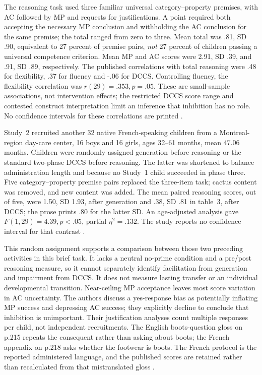 The reasoning task used three familiar universal category--property premises,
with AC followed by MP and requests for justifications. A point required both
accepting the necessary MP conclusion and withholding the AC conclusion for
the same premise; the total ranged from zero to three. Mean total was .81,
SD .90, equivalent to 27 percent of premise pairs, \emph{not} 27 percent
of children passing a universal competence criterion. Mean MP and AC scores
were 2.91, SD .39, and .91, SD .89, respectively. The published correlations
with total reasoning were .48 for flexibility, .37 for fluency and -.06 for
DCCS. Controlling fluency, the flexibility correlation was
\(r(29)=.353,p=.05\). These are small-sample associations, not intervention
effects; the restricted DCCS score range and contested construct interpretation
limit an inference that inhibition has no role. No confidence intervals for
these correlations are printed
\cite[pp.~212--214, tables~1--2]{DeChantalMarkovits2017Alternatives}.

Study~2 recruited another 32 native French-speaking children from a
Montreal-region day-care center, 16 boys and 16 girls, ages 32--61 months,
mean 47.06 months. Children were randomly assigned generation before reasoning
or the standard two-phase DCCS before reasoning. The latter was shortened
to balance administration length and because no Study~1 child succeeded in
phase three. Five category--property premise pairs replaced the three-item
task; cactus content was removed, and new content was added. The mean paired
reasoning scores, out of five, were 1.50, SD 1.93, after generation and .38,
SD .81 in table~3, after DCCS; the prose prints .80 for the latter SD.
An age-adjusted analysis gave \(F(1,29)=4.39,p<.05\), partial
\(\eta^2=.132\). The study reports no confidence interval for that contrast
\cite[pp.~214--216]{DeChantalMarkovits2017Alternatives}.

This random assignment supports a comparison between those two preceding
activities in this brief task. It lacks a neutral no-prime condition and a
pre/post reasoning measure, so it cannot separately identify facilitation
from generation and impairment from DCCS. It does not measure lasting transfer
or an individual developmental transition. Near-ceiling MP acceptance leaves
most score variation in AC uncertainty. The authors discuss a yes-response
bias as potentially inflating MP success and depressing AC success; they
explicitly decline to conclude that inhibition is unimportant. Their
justification analyses count multiple responses per child, not independent
recruitments. The English boots-question gloss on p.215 repeats the
consequent rather than asking about boots; the French appendix on p.218 asks
whether the footwear is boots. The French protocol is the reported administered
language, and the published scores are retained rather than recalculated from
that mistranslated gloss
\cite[pp.~215--218]{DeChantalMarkovits2017Alternatives}.

